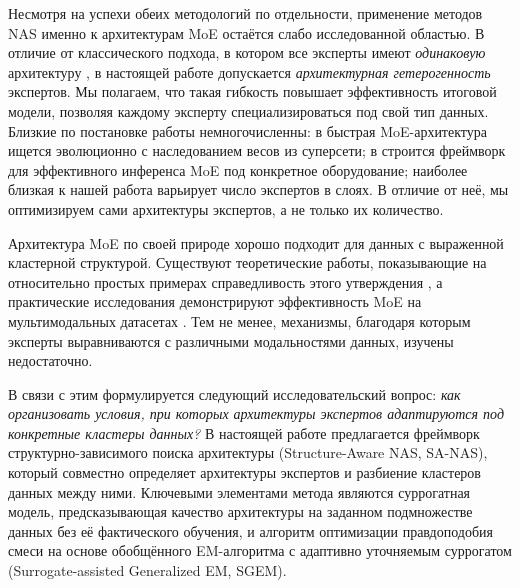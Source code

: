Несмотря на успехи обеих методологий по отдельности, применение методов
NAS именно к архитектурам MoE остаётся слабо исследованной областью. В
отличие от классического подхода, в котором все эксперты имеют
\emph{одинаковую} архитектуру \cite{fedus2022switch}, в настоящей работе
допускается \emph{архитектурная гетерогенность} экспертов. Мы полагаем,
что такая гибкость повышает эффективность итоговой модели, позволяя
каждому эксперту специализироваться под свой тип данных. Близкие по
постановке работы немногочисленны: в \cite{jawahar2022automoe} быстрая
MoE-архитектура ищется эволюционно с наследованием весов из суперсети; в
\cite{han2024cmn} строится фреймворк для эффективного инференса MoE под
конкретное оборудование; наиболее близкая к нашей работа
\cite{mecharbat2025moenas} варьирует число экспертов в слоях. В отличие
от неё, мы оптимизируем сами архитектуры экспертов, а не только их
количество.

Архитектура MoE по своей природе хорошо подходит для данных с выраженной
кластерной структурой. Существуют теоретические работы, показывающие на
относительно простых примерах справедливость этого утверждения
\cite{chen2022towards}, а практические исследования демонстрируют
эффективность MoE на мультимодальных датасетах
\cite{chai2022mixture, guo2018multi, hu2025multi}. Тем не менее,
механизмы, благодаря которым эксперты выравниваются с различными
модальностями данных, изучены недостаточно.

В связи с этим формулируется следующий исследовательский вопрос:
\textit{как организовать условия, при которых архитектуры экспертов
адаптируются под конкретные кластеры данных?} В настоящей работе
предлагается фреймворк структурно-зависимого поиска архитектуры
(Structure-Aware NAS, SA-NAS), который совместно определяет архитектуры
экспертов и разбиение кластеров данных между ними. Ключевыми элементами
метода являются суррогатная модель, предсказывающая качество архитектуры
на заданном подмножестве данных без её фактического обучения, и
алгоритм оптимизации правдоподобия смеси на основе обобщённого
EM-алгоритма с адаптивно уточняемым суррогатом (Surrogate-assisted
Generalized EM, SGEM).

